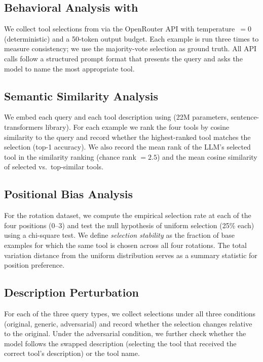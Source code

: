 \subsection{Behavioral Analysis with \gptmini}
\label{sec:llm_expts}

We collect tool selections from \gptmini via the OpenRouter API with temperature~$= 0$
(deterministic) and a 50-token output budget.  Each example is run three times to measure
consistency; we use the majority-vote selection as ground truth.  All API calls follow a
structured prompt format that presents the query and asks the model to name the most
appropriate tool.

\subsection{Semantic Similarity Analysis}
\label{sec:semsim}

We embed each query and each tool description using \minilm (22M parameters,
sentence-transformers library).  For each example we rank the four tools by cosine
similarity to the query and record whether the highest-ranked tool matches the \gptmini
selection (top-1 accuracy).  We also record the mean rank of the LLM's selected tool in
the similarity ranking (chance rank $= 2.5$) and the mean cosine similarity of selected
vs.\ top-similar tools.

\subsection{Positional Bias Analysis}
\label{sec:pos}

For the rotation dataset, we compute the empirical selection rate at each of the four
positions (0--3) and test the null hypothesis of uniform selection (25\% each) using a
chi-square test.  We define \emph{selection stability} as the fraction of base examples
for which the same tool is chosen across all four rotations.  The total variation distance
from the uniform distribution serves as a summary statistic for position preference.

\subsection{Description Perturbation}
\label{sec:perturb}

For each of the three query types, we collect \gptmini selections under all three
conditions (original, generic, adversarial) and record whether the selection changes
relative to the original.  Under the adversarial condition, we further check whether the
model follows the swapped description (selecting the tool that received the correct tool's
description) or the tool name.


